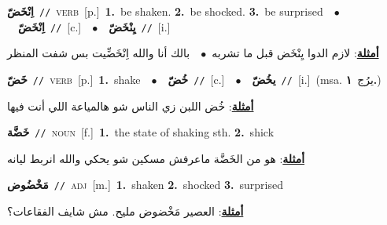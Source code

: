 \documentclass[10pt,a4paper,twoside]{article} %
\begin{document}
\begin{multicols}{2}
{\setlength\topsep{0pt}\textbf{\foreignlanguage{arabic}{اِنْخَضّ}}\ {\color{gray}\texttt{//}\color{black}}\ \textsc{verb}\ [p.]\ \textbf{1.}~be shaken.  \textbf{2.}~be shocked.  \textbf{3.}~be surprised\ \ $\bullet$\ \ \setlength\topsep{0pt}\textbf{\foreignlanguage{arabic}{اِنْخَضّ}}\ {\color{gray}\texttt{//}\color{black}}\ [c.]\ \ $\bullet$\ \ \setlength\topsep{0pt}\textbf{\foreignlanguage{arabic}{يِنْخَضّ}}\ {\color{gray}\texttt{//}\color{black}}\ [i.]\  \begin{flushright}\color{gray}\foreignlanguage{arabic}{\textbf{\underline{\foreignlanguage{arabic}{أمثلة}}}: لازم الدوا يِنْخَض قبل ما تشربه\ $\bullet$\ \  بالك أنا والله اِنْخَضِّيت بس شفت المنظر}\end{flushright}\color{black}} \vspace{2mm}

{\setlength\topsep{0pt}\textbf{\foreignlanguage{arabic}{خَضّ}}\ {\color{gray}\texttt{//}\color{black}}\ \textsc{verb}\ [p.]\ \textbf{1.}~shake\ \ $\bullet$\ \ \setlength\topsep{0pt}\textbf{\foreignlanguage{arabic}{خُضّ}}\ {\color{gray}\texttt{//}\color{black}}\ [c.]\ \ $\bullet$\ \ \setlength\topsep{0pt}\textbf{\foreignlanguage{arabic}{يخُضّ}}\ {\color{gray}\texttt{//}\color{black}}\ [i.]\ \color{gray}(msa. \foreignlanguage{arabic}{يرُج}~\foreignlanguage{arabic}{\textbf{١.}})\color{black}\  \begin{flushright}\color{gray}\foreignlanguage{arabic}{\textbf{\underline{\foreignlanguage{arabic}{أمثلة}}}: خُض اللبن زي الناس شو هالمياعة اللي أنت فيها}\end{flushright}\color{black}} \vspace{2mm}

{\setlength\topsep{0pt}\textbf{\foreignlanguage{arabic}{خَضَّة}}\ {\color{gray}\texttt{//}\color{black}}\ \textsc{noun}\ [f.]\ \textbf{1.}~the state of shaking sth.  \textbf{2.}~shick\  \begin{flushright}\color{gray}\foreignlanguage{arabic}{\textbf{\underline{\foreignlanguage{arabic}{أمثلة}}}: هو من الخَضَّة ماعرفش مسكين شو يحكي والله انربط ليانه}\end{flushright}\color{black}} \vspace{2mm}

{\setlength\topsep{0pt}\textbf{\foreignlanguage{arabic}{مَخْضُوض}}\ {\color{gray}\texttt{//}\color{black}}\ \textsc{adj}\ [m.]\ \textbf{1.}~shaken  \textbf{2.}~shocked  \textbf{3.}~surprised\  \begin{flushright}\color{gray}\foreignlanguage{arabic}{\textbf{\underline{\foreignlanguage{arabic}{أمثلة}}}: العصير مَخْضوض مليح. مش شايف الفقاعات؟}\end{flushright}\color{black}} \vspace{2mm}


\end{multicols}
\end{document}
